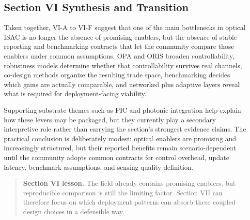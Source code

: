 \subsection{Section VI Synthesis and Transition}
\label{sec:enablers-synthesis}

Taken together, VI-A to VI-F suggest that one of the main bottlenecks in optical ISAC is no longer the absence of promising enablers, but the absence of stable reporting and benchmarking contracts that let the community compare those enablers under common assumptions. OPA and ORIS broaden controllability, robustness models determine whether that controllability survives real channels, co-design methods organize the resulting trade space, benchmarking decides which gains are actually comparable, and networked plus adaptive layers reveal what is required for deployment-facing viability.

Supporting substrate themes such as PIC and photonic integration help explain how these levers may be packaged, but they currently play a secondary interpretive role rather than carrying the section's strongest evidence claims. The practical conclusion is deliberately modest: optical enablers are promising and increasingly structured, but their reported benefits remain scenario-dependent until the community adopts common contracts for control overhead, update latency, benchmark assumptions, and sensing-quality definition.

\begin{quote}
\textbf{Section VI lesson.} The field already contains promising enablers, but reproducible comparison is still the limiting factor. Section VII can therefore focus on which deployment patterns can absorb these coupled design choices in a defensible way.
\end{quote}
